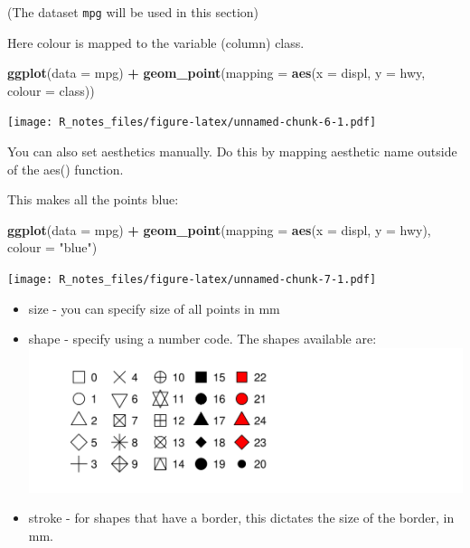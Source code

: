 \documentclass[]{book}
\newenvironment{Shaded}{\begin{snugshade}}{\end{snugshade}}
\newcommand{\KeywordTok}[1]{\textcolor[rgb]{0.13,0.29,0.53}{\textbf{#1}}}
\newcommand{\DataTypeTok}[1]{\textcolor[rgb]{0.13,0.29,0.53}{#1}}
\newcommand{\StringTok}[1]{\textcolor[rgb]{0.31,0.60,0.02}{#1}}
\newcommand{\OperatorTok}[1]{\textcolor[rgb]{0.81,0.36,0.00}{\textbf{#1}}}
\newcommand{\NormalTok}[1]{#1}
\providecommand{\tightlist}{%
  \setlength{\itemsep}{0pt}\setlength{\parskip}{0pt}}
\begin{document}
(The dataset \texttt{mpg} will be used in this section)

Here colour is mapped to the variable (column) class.

\begin{Shaded}
\begin{Highlighting}[]
\KeywordTok{ggplot}\NormalTok{(}\DataTypeTok{data =}\NormalTok{ mpg) }\OperatorTok{+}\StringTok{ }
\StringTok{  }\KeywordTok{geom_point}\NormalTok{(}\DataTypeTok{mapping =} \KeywordTok{aes}\NormalTok{(}\DataTypeTok{x =}\NormalTok{ displ, }\DataTypeTok{y =}\NormalTok{ hwy, }\DataTypeTok{colour =}\NormalTok{ class))}
\end{Highlighting}
\end{Shaded}

\texttt{[image: R\_notes\_files/figure-latex/unnamed-chunk-6-1.pdf]}

You can also set aesthetics manually. Do this by mapping aesthetic name
outside of the aes() function.

This makes all the points blue:

\begin{Shaded}
\begin{Highlighting}[]
\KeywordTok{ggplot}\NormalTok{(}\DataTypeTok{data =}\NormalTok{ mpg) }\OperatorTok{+}\StringTok{ }
\StringTok{  }\KeywordTok{geom_point}\NormalTok{(}\DataTypeTok{mapping =} \KeywordTok{aes}\NormalTok{(}\DataTypeTok{x =}\NormalTok{ displ, }\DataTypeTok{y =}\NormalTok{ hwy), }\DataTypeTok{colour =} \StringTok{"blue"}\NormalTok{)}
\end{Highlighting}
\end{Shaded}

\texttt{[image: R\_notes\_files/figure-latex/unnamed-chunk-7-1.pdf]}

\begin{itemize}
\tightlist
\item
  size - you can specify size of all points in mm
\item
  shape - specify using a number code. The shapes available are:
  \includegraphics{Images/shapes-1.png}
\item
  stroke - for shapes that have a border, this dictates the size of the
  border, in mm.
\end{itemize}
\end{document}
